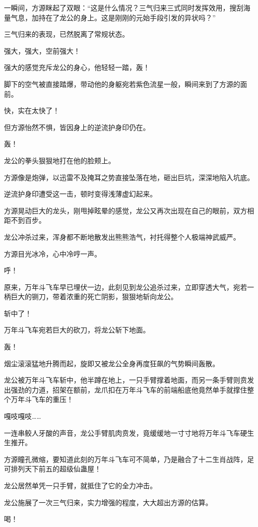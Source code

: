 \begin{this_body}
一瞬间，方源眯起了双眼：“这是什么情况？三气归来三式同时发挥效用，搜刮海量气息，加持在了龙公的身上。这是刚刚的元始手段引发的异状吗？”

三气归来的表现，已然脱离了常规状态。

强大，强大，空前强大！

强大的感觉充斥龙公的身心，他轻轻一踏，轰！

脚下的空气被直接踏爆，带动他的身躯宛若紫色流星一般，瞬间来到了方源的面前。

快，实在太快了！

但方源怡然不惧，皆因身上的逆流护身印仍在。

轰！

龙公的拳头狠狠地打在他的脸颊上。

方源像是炮弹，以迅雷不及掩耳之势直接坠落在地，砸出巨坑，深深地陷入坑底。

逆流护身印遭受这一击，顿时变得浅薄虚幻起来。

方源晃动巨大的龙头，刚甩掉眩晕的感觉，龙公又再次出现在自己的眼前，双方相距不到百步。

龙公冲杀过来，浑身都不断地散发出熊熊浩气，衬托得整个人极端神武威严。

方源目光冰冷，心中冷哼一声。

呼！

原来，万年斗飞车早已埋伏一边，此刻见到龙公追杀过来，立即穿透大气，宛若一柄巨大的铡刀，带着浓重的死亡阴影，狠狠地斩向龙公。

斩中了！

万年斗飞车宛若巨大的砍刀，将龙公斩下地面。

轰！

烟尘滚滚猛地升腾而起，旋即又被龙公全身再度狂飙的气势瞬间轰散。

龙公被万年斗飞车斩中，他半蹲在地上，一只手臂撑着地面，而另一条手臂则贲发出强劲的力道，招架在额前，龙爪扣在万年斗飞车的前端船底他竟然单手就撑住整个万年斗飞车的重压！

嘎吱嘎吱……

一连串鲛人牙酸的声音，龙公手臂肌肉贲发，竟缓缓地一寸寸地将万年斗飞车硬生生推开。

方源瞳孔微缩，要知道此刻的万年斗飞车可不简单，乃是融合了十二生肖战阵，足可排列天下前五的超级仙蛊屋！

龙公居然单凭一只手臂，就抵住了它的全力冲击。

龙公施展了一次三气归来，实力增强的程度，大大超出方源的估算。

喝！


\end{this_body}
